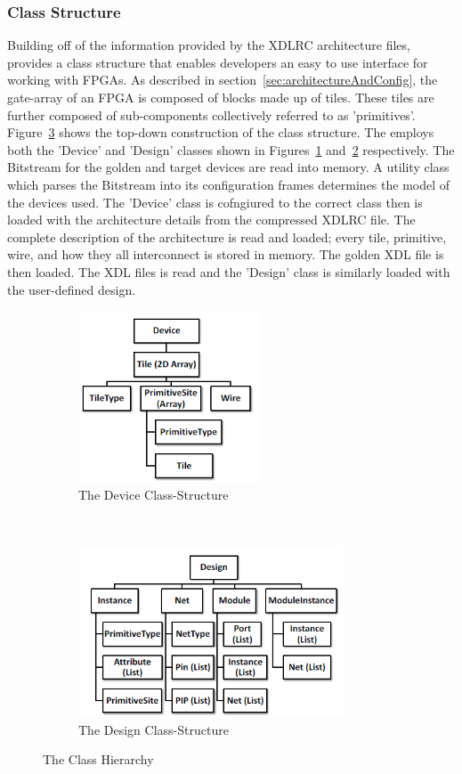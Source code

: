 \subsubsection{Class Structure} \label{sec:classStructure}
Building off of the information provided by the XDLRC architecture files, \RapidSmith provides a class structure that enables developers an easy to use interface for working with \acrshort{FPGA}s.
As described in section~\ref{sec:architectureAndConfig}, the gate-array of an \acrshort{FPGA} is composed of blocks made up of tiles.
These tiles are further composed of sub-components collectively referred to as 'primitives'.
Figure~\ref{fig:classStructures} shows the top-down construction of the \RapidSmith class structure.
The \NameNoPeriod employs both the 'Device' and 'Design' classes shown in Figures~\ref{fig:rapidSmithDevice} and~\ref{fig:rapidSmithDesign} respectively.
The \gls{Bitstream} for the \gls{golden} and \gls{target} devices are read into memory. 
A utility class which parses the \gls{Bitstream} into its configuration frames determines the model of the devices used.
The 'Device' class is cofngiured to the correct class then is loaded with the architecture details from the compressed XDLRC file.
The complete description of the architecture is read and loaded; every tile, primitive, wire, and how they all interconnect is stored in memory.
The \gls{golden} \acrshort{XDL} file is then loaded.
The \acrshort{XDL} files is read and the 'Design' class is similarly loaded with the user-defined design.
\begin{figure}[h]
	\centering
	\begin{subfigure}[t]{0.5\textwidth}
			\centering
			\includegraphics[height=2in]{Figures/rapidSmithDevice}
			\caption{The Device Class-Structure}
			\label{fig:rapidSmithDevice}
	\end{subfigure}%
	~ 
	\begin{subfigure}[t]{0.5\textwidth}
		\centering
		\includegraphics[height=2in]{Figures/rapidSmithDesign}
		\caption{The Design Class-Structure}
		 \label{fig:rapidSmithDesign}
	\end{subfigure}
	\caption{The \RapidSmith Class Hierarchy~\cite{rapidSmithManual}}
	 \label{fig:classStructures}
\end{figure}
